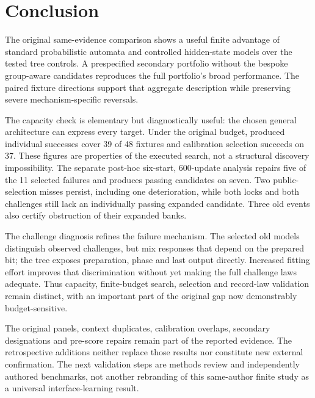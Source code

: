 

\section{Conclusion}\label{sec:conclusion}
The original same-evidence comparison shows a useful finite advantage of standard probabilistic automata and controlled hidden-state models over the tested tree controls. A prespecified secondary portfolio without the bespoke group-aware candidates reproduces the full portfolio's broad performance. The paired fixture directions support that aggregate description while preserving severe mechanism-specific reversals.

The capacity check is elementary but diagnostically useful: the chosen general architecture can express every target. Under the original budget, produced individual successes cover 39 of 48 fixtures and calibration selection succeeds on 37. These figures are properties of the executed search, not a structural discovery impossibility. The separate post-hoc six-start, 600-update analysis repairs five of the 11 selected failures and produces passing candidates on seven. Two public-selection misses persist, including one deterioration, while both locks and both challenges still lack an individually passing expanded candidate. Three old events also certify obstruction of their expanded banks.

The challenge diagnosis refines the failure mechanism. The selected old models distinguish observed challenges, but mix responses that depend on the prepared bit; the tree exposes preparation, phase and last output directly. Increased fitting effort improves that discrimination without yet making the full challenge laws adequate. Thus capacity, finite-budget search, selection and record-law validation remain distinct, with an important part of the original gap now demonstrably budget-sensitive.

The original panels, context duplicates, calibration overlaps, secondary designations and pre-score repairs remain part of the reported evidence. The retrospective additions neither replace those results nor constitute new external confirmation. The next validation steps are methods review and independently authored benchmarks, not another rebranding of this same-author finite study as a universal interface-learning result.


